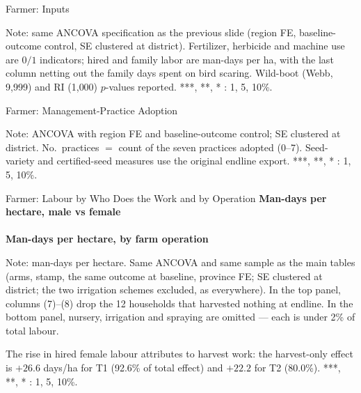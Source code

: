\documentclass[aspectratio=169]{beamer}
\newcommand{\notefont}{\fontsize{5pt}{6pt}\selectfont}
\begin{document}
\begin{frame}{Farmer: Inputs}
	\centering
	\begin{minipage}{0.94\textwidth}
		\notefont
		Note: same ANCOVA specification as the previous slide (region FE,
		baseline-outcome control, SE clustered at district). Fertilizer, herbicide and machine
		use are $0/1$ indicators; hired and family labor are man-days per ha, with the last
		column netting out the family days spent on bird scaring. Wild-boot (Webb, 9{,}999)
		and RI (1{,}000) $p$-values reported. ***, **, * : 1, 5, 10\%.
	\end{minipage}
\end{frame}





\begin{frame}{Farmer: Management-Practice Adoption}
	\centering
	\begin{minipage}{0.94\textwidth}
		\notefont
		Note: ANCOVA with region FE and baseline-outcome control; SE clustered at district.
		No.\ practices $=$ count of the seven practices adopted (0--7). Seed-variety and
		certified-seed measures use the original endline export. ***, **, * : 1, 5, 10\%.
	\end{minipage}
\end{frame}

\begin{frame}{Farmer: Labour by Who Does the Work and by Operation}
	\centering
	{\notefont\textbf{Man-days per hectare, male vs female}}\\[1pt]
	\\[4pt]
	{\notefont\textbf{Man-days per hectare, by farm operation}}\\[1pt]
	\begin{minipage}{0.94\textwidth}
		\notefont
		Note: man-days per hectare. Same ANCOVA and same sample as the main tables (arms, stamp,
		the same outcome at baseline, province FE; SE clustered at district; the two
		irrigation schemes excluded, as everywhere). 
		In the top panel, columns (7)--(8) drop the 12 households that
		harvested nothing at endline. In the bottom panel, nursery, irrigation and spraying are
		omitted --- each is under 2\% of total labour.
		\par The rise in hired female labour attributes to harvest work: the
		harvest-only effect is $+26.6$ days/ha for T1 (92.6\% of total effect) and $+22.2$ for T2 (80.0\%).
		***, **, * : 1, 5, 10\%.
	\end{minipage}
\end{frame}
\end{document}
